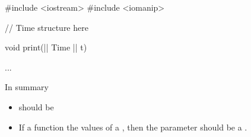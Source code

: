 \begin{consolethree}[escapeinside=||]
#include <iostream>
#include <iomanip>

// Time structure here

void print(|| Time |\EMPHASIZE{\&}| t)
{
}

...
\end{consolethree}

In summary
\begin{itemize}
\item {} should be 
\item If a function  the values of a
, then the parameter should be a
.
\end{itemize}





